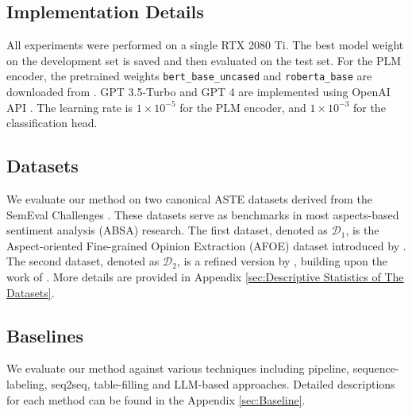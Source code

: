 \documentclass[11pt]{article}
\begin{document}

\subsection{Implementation Details}

All experiments were performed on a single RTX 2080 Ti. 
The best model weight on the development set is saved and then evaluated on the test set. For the PLM encoder, the pretrained weights \texttt{bert\_base\_uncased} and \texttt{roberta\_base} are downloaded from \citep{wolf2020transformers}. GPT 3.5-Turbo and GPT 4 are implemented using OpenAI API \cite{openai_api}.
The learning rate is $1\times 10^{-5}$ for the PLM encoder, and $1\times 10^{-3}$ for the classification head. 

\subsection{Datasets}
We evaluate our method on two canonical ASTE datasets derived from the SemEval Challenges \cite{pontiki2014novel, pontiki2015semeval, pontiki2016semeval}. These datasets serve as benchmarks in most aspects-based sentiment analysis (ABSA) research. The first dataset, denoted as $\mathcal{D}_1$, is the Aspect-oriented Fine-grained Opinion Extraction (AFOE) dataset introduced by \cite{wu2020grid}. The second dataset, denoted as $\mathcal{D}_2$, is a refined version by \cite{xu2020position}, building upon the work of \cite{peng2020knowing}. More details are provided in Appendix \ref{sec:Descriptive Statistics of The Datasets}.

\subsection{Baselines}
We evaluate our method against various techniques including pipeline, sequence-labeling, seq2seq, table-filling and LLM-based approaches. Detailed descriptions for each method can be found in the Appendix \ref{sec:Baseline}.
\end{document}
